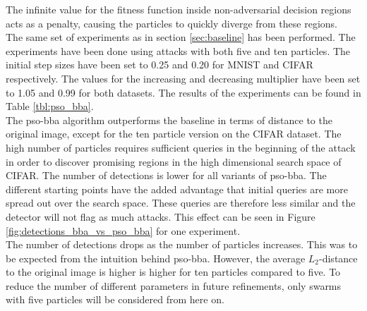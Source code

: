 The infinite value for the fitness function inside non-adversarial decision regions acts as a penalty, causing the particles to quickly diverge from these regions.\\

The same set of experiments as in section \ref{sec:baseline} has been performed. The experiments have been done using attacks with both five and ten particles. The initial step sizes have been set to 0.25 and 0.20 for MNIST and CIFAR respectively. The values for the increasing and decreasing multiplier have been set to 1.05 and 0.99 for both datasets. The results of the experiments can be found in Table \ref{tbl:pso_bba}.\\

The \gls{pso}-\gls{bba} algorithm outperforms the baseline in terms of distance to the original image, except for the ten particle version on the CIFAR dataset. The high number of particles requires sufficient queries in the beginning of the attack in order to discover promising regions in the high dimensional search space of CIFAR. The number of detections is lower for all variants of \gls{pso}-\gls{bba}. The different starting points have the added advantage that initial queries are more spread out over the search space. These queries are therefore less similar and the detector will not flag as much attacks. This effect can be seen in Figure \ref{fig:detections_bba_vs_pso_bba} for one experiment.\\

The number of detections drops as the number of particles increases. This was to be expected from the intuition behind \gls{pso}-\gls{bba}. However, the average $L_2$-distance to the original image is higher is higher for ten particles compared to five. To reduce the number of different parameters in future refinements, only swarms with five particles will be considered from here on.\\ 

